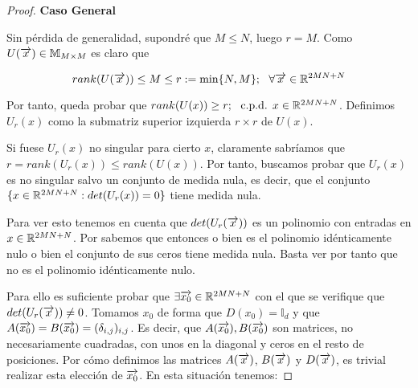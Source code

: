 \begin{proof}
    \textbf{Caso General}

    Sin pérdida de generalidad, supondré que $M \leq N$, luego $r = M$. Como $U(\overrightarrow{x}) \in \mathbb{M}_{M \times M}$ es claro que

    \begin{equation}
        rank(U(\overrightarrow{x})) \leq M \leq r := \min \{N, M \}; \ \  \forall \overrightarrow{x} \in \mathbb{R}^{2MN + N}
    \end{equation}

    Por tanto, queda probar que $rank(U(x)) \geq r; \ \  \text{c.p.d. } x \in \mathbb{R}^{2MN + N}$. Definimos $U_r(x)$ como la submatriz superior izquierda $r \times r$ de $U(x)$.

    Si fuese $U_r(x)$ no singular para cierto $x$, claramente sabríamos que $r = rank(U_r(x)) \leq rank(U(x))$. Por tanto, buscamos probar que $U_r(x)$ es no singular salvo un conjunto de medida nula, es decir, que el conjunto $\{ x \in \mathbb{R}^{2MN + N} : det(U_r(x)) = 0  \}$ tiene medida nula.

    Para ver esto tenemos en cuenta que $det(U_r(\overrightarrow{x}))$ es un polinomio con entradas en $x \in \mathbb{R}^{2MN + N}$. Por  sabemos que entonces o bien es el polinomio idénticamente nulo o bien el conjunto de sus ceros tiene medida nula. Basta ver por tanto que no es el polinomio idénticamente nulo.

    Para ello es suficiente probar que $\exists \overrightarrow{x_0} \in \mathbb{R}^{2MN + N}$ con el que se verifique que $det(U_r(\overrightarrow{x})) \neq 0$. Tomamos $x_0$ de forma que $D(x_0) = \mathbb{I}_d$ y que $A(\overrightarrow{x_0}) = B(\overrightarrow{x_0}) = (\delta_{i,j})_{i,j}$. Es decir, que $A(\overrightarrow{x_0}), B(\overrightarrow{x_0})$ son matrices, no necesariamente cuadradas, con unos en la diagonal y ceros en el resto de posiciones. Por cómo definimos las matrices $A(\overrightarrow{x})$, $B(\overrightarrow{x})$ y $D(\overrightarrow{x})$, es trivial realizar esta elección de $\overrightarrow{x_0}$. En esta situación tenemos:


\end{proof}
